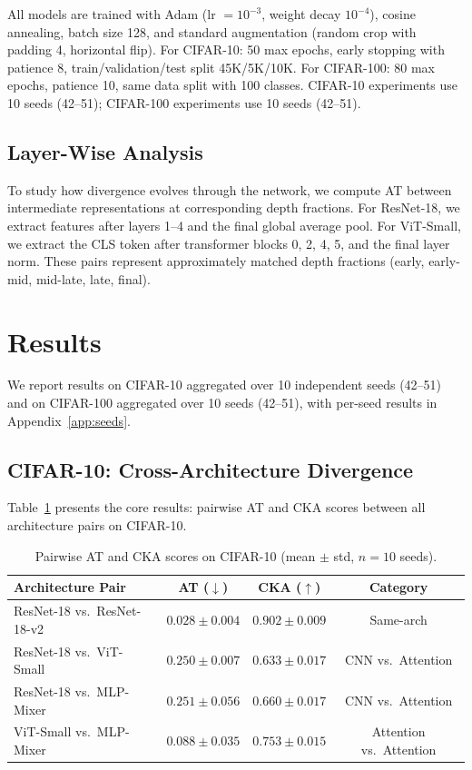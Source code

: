 \documentclass{article}
\begin{document}
All models are trained with Adam (lr $= 10^{-3}$, weight decay $10^{-4}$), cosine annealing, batch size 128, and standard augmentation (random crop with padding 4, horizontal flip). For CIFAR-10: 50 max epochs, early stopping with patience 8, train/validation/test split 45K/5K/10K. For CIFAR-100: 80 max epochs, patience 10, same data split with 100 classes. CIFAR-10 experiments use 10 seeds (42--51); CIFAR-100 experiments use 10 seeds (42--51).

\subsection{Layer-Wise Analysis}

To study how divergence evolves through the network, we compute AT between intermediate representations at corresponding depth fractions. For ResNet-18, we extract features after layers 1--4 and the final global average pool. For ViT-Small, we extract the CLS token after transformer blocks 0, 2, 4, 5, and the final layer norm. These pairs represent approximately matched depth fractions (early, early-mid, mid-late, late, final).

\section{Results}
\label{sec:results}

We report results on CIFAR-10 aggregated over 10 independent seeds (42--51) and on CIFAR-100 aggregated over 10 seeds (42--51), with per-seed results in Appendix~\ref{app:seeds}.

\subsection{CIFAR-10: Cross-Architecture Divergence}

Table~\ref{tab:primary} presents the core results: pairwise AT and CKA scores between all architecture pairs on CIFAR-10.

\begin{table}[t]
\caption{Pairwise AT and CKA scores on CIFAR-10 (mean $\pm$ std, $n{=}10$ seeds).}
\label{tab:primary}
\centering
\small
\begin{tabular}{@{}lccc@{}}
\toprule
Architecture Pair & AT ($\downarrow$) & CKA ($\uparrow$) & Category \\
\midrule
ResNet-18 vs.\ ResNet-18-v2 & $0.028 \pm 0.004$ & $0.902 \pm 0.009$ & Same-arch \\
\midrule
ResNet-18 vs.\ ViT-Small    & $0.250 \pm 0.007$ & $0.633 \pm 0.017$ & CNN vs.\ Attention \\
ResNet-18 vs.\ MLP-Mixer    & $0.251 \pm 0.056$ & $0.660 \pm 0.017$ & CNN vs.\ Attention \\
ViT-Small vs.\ MLP-Mixer    & $0.088 \pm 0.035$ & $0.753 \pm 0.015$ & Attention vs.\ Attention \\
\bottomrule
\end{tabular}
\end{table}
\end{document}
